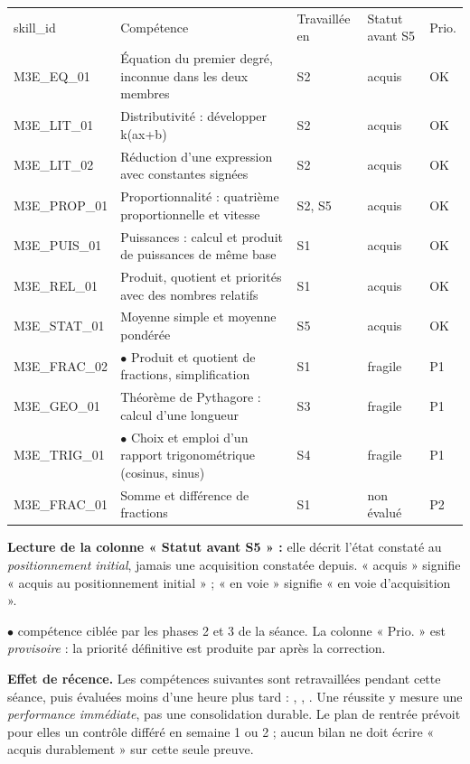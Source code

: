 \documentclass[10pt,a4paper]{article}
\begin{document}
\par\noindent\begin{tabularx}{\linewidth}{>{\ttfamily\scriptsize}p{27mm} X >{\scriptsize}p{16mm} >{\scriptsize}p{20mm} >{\scriptsize\centering\arraybackslash}p{9mm}}
\rowcolor{Navy}\color{white}\scriptsize skill\_id & \color{white}Compétence & \color{white}Travaillée en & \color{white}Statut avant S5 & \color{white}Prio. \\
M3E\_EQ\_01 & Équation du premier degré, inconnue dans les deux membres & S2 & acquis & OK \\
M3E\_LIT\_01 & Distributivité : développer k(ax+b) & S2 & acquis & OK \\
M3E\_LIT\_02 & Réduction d'une expression avec constantes signées & S2 & acquis & OK \\
M3E\_PROP\_01 & Proportionnalité : quatrième proportionnelle et vitesse & S2, S5 & acquis & OK \\
M3E\_PUIS\_01 & Puissances : calcul et produit de puissances de même base & S1 & acquis & OK \\
M3E\_REL\_01 & Produit, quotient et priorités avec des nombres relatifs & S1 & acquis & OK \\
M3E\_STAT\_01 & Moyenne simple et moyenne pondérée & S5 & acquis & OK \\
M3E\_FRAC\_02 & $\bullet$ Produit et quotient de fractions, simplification & S1 & fragile & P1 \\
M3E\_GEO\_01 & Théorème de Pythagore : calcul d'une longueur & S3 & fragile & P1 \\
M3E\_TRIG\_01 & $\bullet$ Choix et emploi d'un rapport trigonométrique (cosinus, sinus) & S4 & fragile & P1 \\
M3E\_FRAC\_01 & Somme et différence de fractions & S1 & non évalué & P2 \\
\end{tabularx}
\par\vspace{1mm}\small\textbf{Lecture de la colonne « Statut avant S5 » :} elle décrit l'état constaté au \emph{positionnement initial}, jamais une acquisition constatée depuis. « acquis » signifie « acquis au positionnement initial » ; « en voie » signifie « en voie d'acquisition ».
\par\small$\bullet$ compétence ciblée par les phases 2 et 3 de la séance. La colonne « Prio. » est \emph{provisoire} : la priorité définitive est produite par  après la correction.
\begin{warningbox}\textbf{Effet de récence.} Les compétences suivantes sont retravaillées pendant cette séance, puis évaluées moins d'une heure plus tard : , , . Une réussite y mesure une \emph{performance immédiate}, pas une consolidation durable. Le plan de rentrée prévoit pour elles un contrôle différé en semaine 1 ou 2 ; aucun bilan ne doit écrire « acquis durablement » sur cette seule preuve.\end{warningbox}
\end{document}
